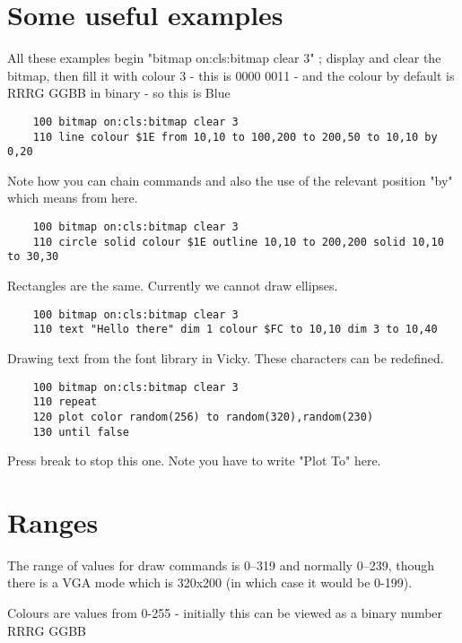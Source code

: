 \section{Some useful examples}

All these examples begin "bitmap on:cls:bitmap clear 3" ; display and clear the bitmap, then fill it with colour 3 - this is 0000 0011 - and the colour by default is RRRG GGBB in binary - so this is Blue

\begin{verbatim}
	100 bitmap on:cls:bitmap clear 3
	110 line colour $1E from 10,10 to 100,200 to 200,50 to 10,10 by 0,20	
\end{verbatim}

Note how you can chain commands  and also the use of the relevant position "by" which means from here.

\begin{verbatim}
	100 bitmap on:cls:bitmap clear 3
	110 circle solid colour $1E outline 10,10 to 200,200 solid 10,10 to 30,30
\end{verbatim}


Rectangles are the same. Currently we cannot draw ellipses.

\begin{verbatim}
	100 bitmap on:cls:bitmap clear 3
	110 text "Hello there" dim 1 colour $FC to 10,10 dim 3 to 10,40	
\end{verbatim}

Drawing text from the font library in Vicky. These characters can be redefined.

\begin{verbatim}
	100 bitmap on:cls:bitmap clear 3
	110 repeat
	120 plot color random(256) to random(320),random(230)
	130 until false
\end{verbatim}

Press break to stop this one. Note you have to write "Plot To" here.

\section{Ranges}
The range of values for draw commands is 0–319 and normally 0–239, though there is a VGA mode which is 320x200 (in which case it would be 0-199).

Colours are values from 0-255 - initially this can be viewed as a binary number RRRG GGBB
